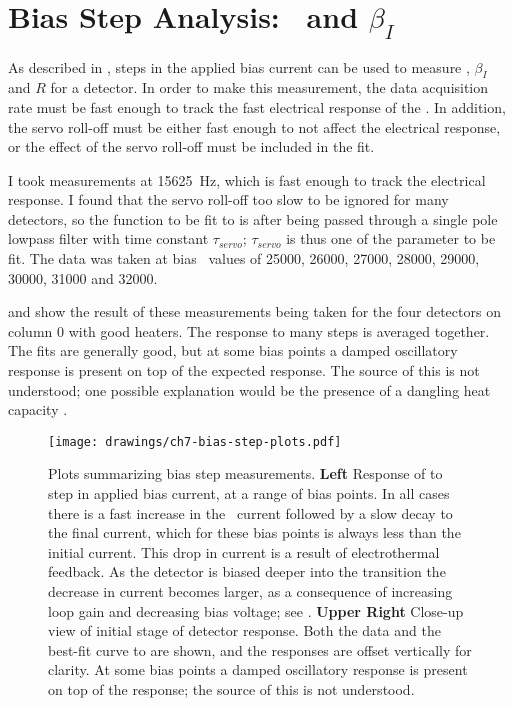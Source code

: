 \section{Bias Step Analysis: \Loop\ and $\beta_I$} \label{sec:bias-step}

As described in , steps in the applied bias current can be used to measure \Loop, $\beta_I$ and $R$ for a detector.
In order to make this measurement, the data acquisition rate must be fast enough to track the fast electrical response of the \TES.
In addition, the servo roll-off must be either fast enough to not affect the electrical response, or the effect of the servo roll-off must be included in the fit.

I took measurements at \SI{15625}{\hertz}, which is fast enough to track the electrical response.
I found that the servo roll-off too slow to be ignored for many detectors, so the function to be fit to is  after being passed through a single pole lowpass filter with time constant $\tau_{servo}$; $\tau_{servo}$ is thus one of the parameter to be fit.
The data was taken at bias \DAC\ values of 25000, 26000, 27000, 28000, 29000, 30000, 31000 and 32000.

 and  show the result of these measurements being taken for the four detectors on column 0 with good heaters.
The response to many steps is averaged together.
The fits are generally good, but at some bias points a damped oscillatory response is present on top of the expected  response.
The source of this is not understood; one possible explanation would be the presence of a dangling heat capacity \cite{xxx}.

\begin{figure*}
  \centering
\texttt{[image: drawings/ch7-bias-step-plots.pdf]}
\caption{%
  Plots summarizing bias step measurements.
\textbf{Left}
Response of  to step in applied bias current, at a range of bias points.
In all cases there is a fast increase in the \TES\ current followed by a slow decay to the final current, which for these bias points is always less than the initial current.
This drop in current is a result of electrothermal feedback.
As the detector is biased deeper into the transition the decrease in current becomes larger, as a consequence of increasing loop gain and decreasing bias voltage; see .
\textbf{Upper Right}
Close-up view of initial stage of detector response.
Both the data and the best-fit curve to  are shown, and the responses are offset vertically for clarity.
At some bias points a damped oscillatory response is present on top of the  response; the source of this is not understood.
}
\label{fig:ch7-bias-step-plots}
\end{figure*}


